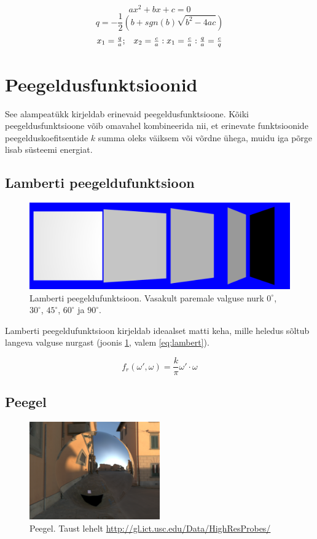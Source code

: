 \documentclass[a4paper,12pt]{report}
\begin{document}
\[ax^2+bx+c=0\]
\[q = -\frac 1 2 \left(b + sgn(b)\sqrt{b^2-4ac}\right)\]
\begin{equation}
\begin{array}{l l} \label{eq:quadratic}
x_1 = \frac q a; & x_2 = \frac c a : x_1 = \frac c a : \frac q a = \frac c q
\end{array}
\end{equation}

\section{Peegeldusfunktsioonid}
See alampeatükk kirjeldab erinevaid peegeldusfunktsioone. Kõiki
peegeldusfunktsioone võib omavahel kombineerida nii, et erinevate funktsioonide
peegelduskoefitsentide \(k\) summa oleks väiksem või võrdne ühega, muidu
iga põrge lisab süsteemi energiat.

\subsection{Lamberti peegeldufunktsioon}
\begin{figure}
\includegraphics[width=\textwidth]{lambert}
\caption[Lamberti peegeldufunktsioon]{Lamberti peegeldufunktsioon.
Vasakult paremale valguse nurk \(0^\circ\), \(30^\circ\), \(45^\circ\),
\(60^\circ\) ja \(90^\circ\).}
\label{fig:lambert}
\end{figure}
Lamberti peegeldufunktsioon kirjeldab ideaalset matti keha, mille heledus
sõltub langeva valguse nurgast (joonis \ref{fig:lambert}, valem \ref{eq:lambert}).

\begin{equation} \label{eq:lambert}
f_r(\omega', \omega) = \frac k\pi \omega' \cdot \omega
\end{equation}

\subsection{Peegel} 
\label{subsec:peegel}
\begin{figure}
\includegraphics[width=0.499\textwidth]{mirror}
\caption[Peegel]{Peegel. Taust lehelt \url{http://gl.ict.usc.edu/Data/HighResProbes/}}
\label{fig:mirror}
\end{figure}
\end{document}
